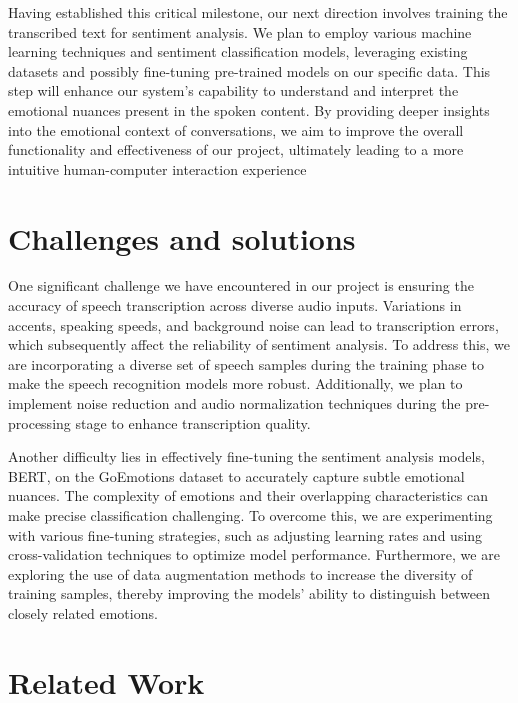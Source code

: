 \documentclass{article} %
\begin{document}
Having established this critical milestone, our next direction involves training the transcribed text for sentiment analysis. We plan to employ various machine learning techniques and sentiment classification models, leveraging existing datasets and possibly fine-tuning pre-trained models on our specific data. This step will enhance our system's capability to understand and interpret the emotional nuances present in the spoken content. By providing deeper insights into the emotional context of conversations, we aim to improve the overall functionality and effectiveness of our project, ultimately leading to a more intuitive human-computer interaction experience




\section{Challenges and solutions}
One significant challenge we have encountered in our project is ensuring the accuracy of speech transcription across diverse audio inputs. Variations in accents, speaking speeds, and background noise can lead to transcription errors, which subsequently affect the reliability of sentiment analysis. To address this, we are incorporating a diverse set of speech samples during the training phase to make the speech recognition models more robust. Additionally, we plan to implement noise reduction and audio normalization techniques during the pre-processing stage to enhance transcription quality.

Another difficulty lies in effectively fine-tuning the sentiment analysis models, BERT, on the GoEmotions dataset to accurately capture subtle emotional nuances. The complexity of emotions and their overlapping characteristics can make precise classification challenging. To overcome this, we are experimenting with various fine-tuning strategies, such as adjusting learning rates and using cross-validation techniques to optimize model performance. Furthermore, we are exploring the use of data augmentation methods to increase the diversity of training samples, thereby improving the models' ability to distinguish between closely related emotions.

\section{Related Work}
\end{document}
